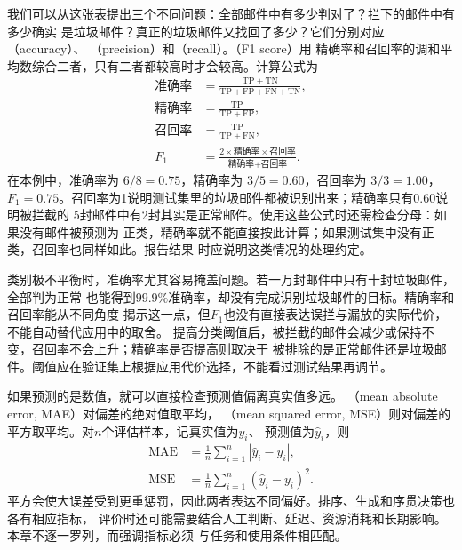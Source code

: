 我们可以从这张表提出三个不同问题：全部邮件中有多少判对了？拦下的邮件中有多少确实
是垃圾邮件？真正的垃圾邮件又找回了多少？它们分别对应（accuracy）、
（precision）和（recall）。（F1 score）用
精确率和召回率的调和平均数综合二者，只有二者都较高时才会较高。计算公式为
\begin{align}
  \text{准确率}
    &=\frac{\mathrm{TP}+\mathrm{TN}}
      {\mathrm{TP}+\mathrm{FP}+\mathrm{FN}+\mathrm{TN}},\\
  \text{精确率}
    &=\frac{\mathrm{TP}}{\mathrm{TP}+\mathrm{FP}},\\
  \text{召回率}
    &=\frac{\mathrm{TP}}{\mathrm{TP}+\mathrm{FN}},\\
  F_1
    &=\frac{2\times\text{精确率}\times\text{召回率}}
      {\text{精确率}+\text{召回率}}.
  \label{eq:classification-measures}
\end{align}
在本例中，准确率为 $6/8=0.75$，精确率为 $3/5=0.60$，召回率为 $3/3=1.00$，
$F_1=0.75$。召回率为1说明测试集里的垃圾邮件都被识别出来；精确率只有0.60说明被拦截的
5封邮件中有2封其实是正常邮件。使用这些公式时还需检查分母：如果没有邮件被预测为
正类，精确率就不能直接按此计算；如果测试集中没有正类，召回率也同样如此。报告结果
时应说明这类情况的处理约定。

类别极不平衡时，准确率尤其容易掩盖问题。若一万封邮件中只有十封垃圾邮件，全部判为正常
也能得到$99.9\%$准确率，却没有完成识别垃圾邮件的目标。精确率和召回率能从不同角度
揭示这一点，但$F_1$也没有直接表达误拦与漏放的实际代价，不能自动替代应用中的取舍。
提高分类阈值后，被拦截的邮件会减少或保持不变，召回率不会上升；精确率是否提高则取决于
被排除的是正常邮件还是垃圾邮件。阈值应在验证集上根据应用代价选择，不能看过测试结果再调节。

如果预测的是数值，就可以直接检查预测值偏离真实值多远。
（mean absolute error, MAE）对偏差的绝对值取平均，
（mean squared error, MSE）则对偏差的平方取平均。对$n$个评估样本，记真实值为$y_i$、
预测值为$\hat{y}_i$，则
\begin{align}
  \operatorname{MAE}
    &=\frac{1}{n}\sum_{i=1}^{n}|\hat{y}_i-y_i|,\\
  \operatorname{MSE}
    &=\frac{1}{n}\sum_{i=1}^{n}(\hat{y}_i-y_i)^2.
\end{align}
平方会使大误差受到更重惩罚，因此两者表达不同偏好。排序、生成和序贯决策也各有相应指标，
评价时还可能需要结合人工判断、延迟、资源消耗和长期影响。本章不逐一罗列，而强调指标必须
与任务和使用条件相匹配。

